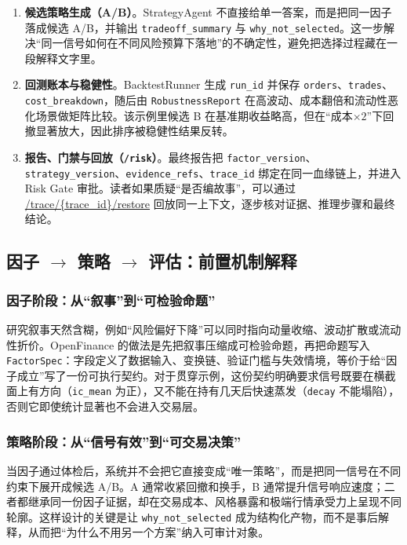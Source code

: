\documentclass{article}
\newcommand{\tok}[1]{\nolinkurl{#1}}
\newenvironment{tokenblock}{\begingroup\RaggedRight\setlength{\parfillskip}{0pt plus 1fil}}{\par\endgroup}
\begin{document}
\begin{tokenblock}
\begin{enumerate}
  \item \textbf{候选策略生成（A/B）}。StrategyAgent 不直接给单一答案，而是把同一因子落成候选 A/B，并输出 \tok{tradeoff_summary} 与 \tok{why_not_selected}。这一步解决“同一信号如何在不同风险预算下落地”的不确定性，避免把选择过程藏在一段解释文字里。

  \item \textbf{回测账本与稳健性}。BacktestRunner 生成 \tok{run_id} 并保存 \tok{orders}、\tok{trades}、\tok{cost_breakdown}，随后由 \tok{RobustnessReport} 在高波动、成本翻倍和流动性恶化场景做矩阵比较。该示例里候选 B 在基准期收益略高，但在“成本$\times 2$”下回撤显著放大，因此排序被稳健性结果反转。

  \item \textbf{报告、门禁与回放（\tok{/risk}）}。最终报告把 \tok{factor_version}、\tok{strategy_version}、\tok{evidence_refs}、\tok{trace_id} 绑定在同一血缘链上，并进入 Risk Gate 审批。读者如果质疑“是否编故事”，可以通过 \url{/trace/\{trace_id\}/restore} 回放同一上下文，逐步核对证据、推理步骤和最终结论。
\end{enumerate}
\end{tokenblock}

\subsection{因子 $\rightarrow$ 策略 $\rightarrow$ 评估：前置机制解释}
\subsubsection{因子阶段：从“叙事”到“可检验命题”}
研究叙事天然含糊，例如“风险偏好下降”可以同时指向动量收缩、波动扩散或流动性折价。OpenFinance 的做法是先把叙事压缩成可检验命题，再把命题写入 \tok{FactorSpec}：字段定义了数据输入、变换链、验证门槛与失效情境，等价于给“因子成立”写了一份可执行契约。对于贯穿示例，这份契约明确要求信号既要在横截面上有方向（\tok{ic_mean} 为正），又不能在持有几天后快速蒸发（\tok{decay} 不能塌陷），否则它即使统计显著也不会进入交易层。

\subsubsection{策略阶段：从“信号有效”到“可交易决策”}
当因子通过体检后，系统并不会把它直接变成“唯一策略”，而是把同一信号在不同约束下展开成候选 A/B。A 通常收紧回撤和换手，B 通常提升信号响应速度；二者都继承同一份因子证据，却在交易成本、风格暴露和极端行情承受力上呈现不同轮廓。这样设计的关键是让 \tok{why_not_selected} 成为结构化产物，而不是事后解释，从而把“为什么不用另一个方案”纳入可审计对象。
\end{document}
